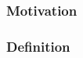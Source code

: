 \subsection{}
\begin{frame}
\frametitle{Motivation}





\end{frame}
\begin{frame}
  \frametitle{Definition}

\end{frame}


\begin{frame}
  \frametitle{}
\end{frame}
